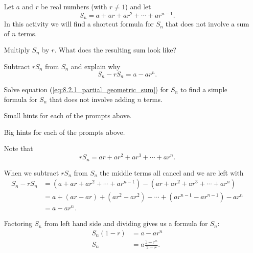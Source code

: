 \begin{activity} \label{8.2.Act1} Let $a$ and $r$ be real numbers (with $r \ne 1$) and let
\[S_n = a+ar+ar^2 + \cdots + ar^{n-1}.\]
In this activity we will find a shortcut formula for $S_n$ that does not involve a sum of $n$ terms.
\ba
\item Multiply $S_n$ by $r$. What does the resulting sum look like?


\item Subtract $rS_n$ from $S_n$ and explain why
\begin{equation} \label{eq:8.2.1_partial_geometric_sum}
S_n - rS_n = a - ar^n.
\end{equation}


\item Solve equation (\ref{eq:8.2.1_partial_geometric_sum}) for $S_n$ to find a simple formula for $S_n$ that does not involve adding $n$ terms.


\ea
\end{activity}

\begin{smallhint}
\ba
	\item Small hints for each of the prompts above.
\ea
\end{smallhint}
\begin{bighint}
\ba
	\item Big hints for each of the prompts above.
\ea
\end{bighint}
\begin{activitySolution}
\ba
	\item Note that
\[rS_n = ar+ar^2+ar^3 + \cdots + ar^n.\]
    \item When we subtract $rS_n$ from $S_n$ the middle terms all cancel and we are left with
\begin{align*}
S_n - rS_n &= \left(a+ar+ar^2 + \cdots + ar^{n-1}\right) - \left(ar+ar^2+ar^3 + \cdots + ar^n\right) \\
    &=a + (ar-ar) + \left(ar^2-ar^2\right) + \cdots + \left(ar^{n-1}-ar^{n-1}\right) - ar^n \\
    &= a - ar^n.
    \end{align*}
    \item Factoring $S_n$ from left hand side and dividing gives us a formula for $S_n$:
\begin{align*}
S_n(1-r) &= a - ar^n \\
S_n &= a\frac{1-r^n}{1-r}.
\end{align*}

\ea
\end{activitySolution}
\aftera 